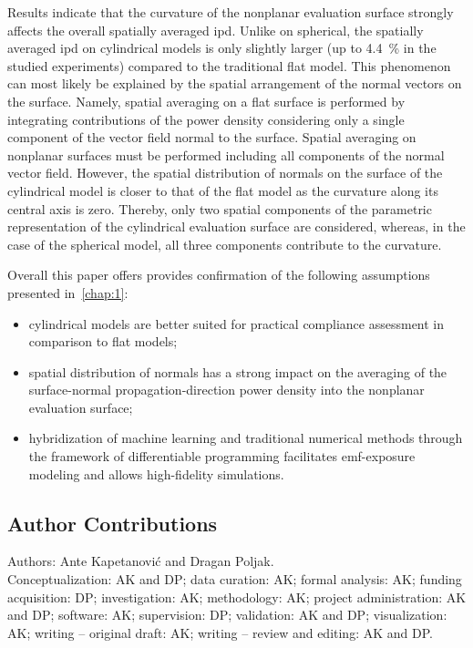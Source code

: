 Results indicate that the curvature of the nonplanar evaluation surface strongly affects the overall spatially averaged \gls{ipd}.
Unlike on spherical, the spatially averaged \gls{ipd} on cylindrical models is only slightly larger (up to \SI{4.4}{\percent} in the studied experiments) compared to the traditional flat model.
This phenomenon can most likely be explained by the spatial arrangement of the normal vectors on the surface.
Namely, spatial averaging on a flat surface is performed by integrating contributions of the power density considering only a single component of the vector field normal to the surface.
Spatial averaging on nonplanar surfaces must be performed including all components of the normal vector field.
However, the spatial distribution of normals on the surface of the cylindrical model is closer to that of the flat model as the curvature along its central axis is zero.
Thereby, only two spatial components of the parametric representation of the cylindrical evaluation surface are considered, whereas, in the case of the spherical model, all three components contribute to the curvature.

Overall this paper offers provides confirmation of the following assumptions presented in~\cref{chap:1}:
\begin{itemize}
    \item cylindrical models are better suited for practical compliance assessment in comparison to flat models;
    \item spatial distribution of normals has a strong impact on the averaging of the surface-normal propagation-direction power density into the nonplanar evaluation surface;
    \item hybridization of machine learning and traditional numerical methods through the framework of differentiable programming facilitates \gls{emf}-exposure modeling and allows high-fidelity simulations.
\end{itemize}

\subsection{Author Contributions}
Authors: Ante Kapetanović and Dragan Poljak.\\
Conceptualization: AK and DP; data curation: AK; formal analysis: AK; funding acquisition: DP; investigation: AK; methodology: AK; project administration: AK and DP; software: AK; supervision: DP; validation: AK and DP; visualization: AK; writing -- original draft: AK; writing -- review and editing: AK and DP.

